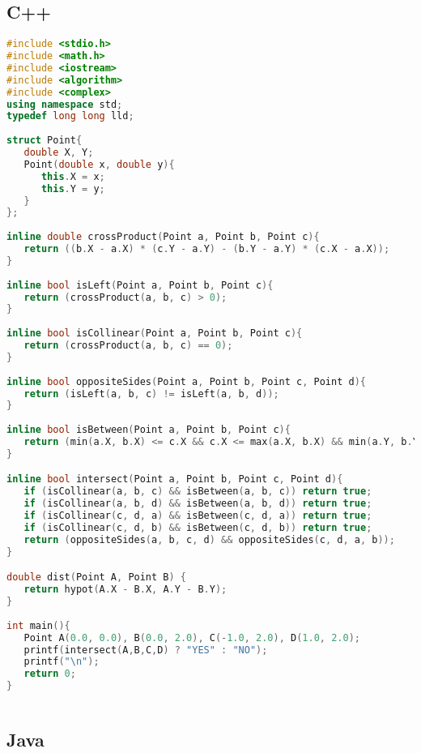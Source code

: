 \subsection{C++}

\begin{lstlisting}[language=C++]
#include <stdio.h>
#include <math.h>
#include <iostream>
#include <algorithm>
#include <complex>
using namespace std;
typedef long long lld;
	
struct Point{
   double X, Y;
   Point(double x, double y){
      this.X = x;
      this.Y = y;
   }
};
	
inline double crossProduct(Point a, Point b, Point c){
   return ((b.X - a.X) * (c.Y - a.Y) - (b.Y - a.Y) * (c.X - a.X));
}
	
inline bool isLeft(Point a, Point b, Point c){
   return (crossProduct(a, b, c) > 0);
}
	
inline bool isCollinear(Point a, Point b, Point c){
   return (crossProduct(a, b, c) == 0);
}
	
inline bool oppositeSides(Point a, Point b, Point c, Point d){
   return (isLeft(a, b, c) != isLeft(a, b, d));
}
	
inline bool isBetween(Point a, Point b, Point c){
   return (min(a.X, b.X) <= c.X && c.X <= max(a.X, b.X) && min(a.Y, b.Y) <= c.Y && c.Y <= max(a.Y,b.Y));
}

inline bool intersect(Point a, Point b, Point c, Point d){
   if (isCollinear(a, b, c) && isBetween(a, b, c)) return true;
   if (isCollinear(a, b, d) && isBetween(a, b, d)) return true;
   if (isCollinear(c, d, a) && isBetween(c, d, a)) return true;
   if (isCollinear(c, d, b) && isBetween(c, d, b)) return true;
   return (oppositeSides(a, b, c, d) && oppositeSides(c, d, a, b));
}

double dist(Point A, Point B) {
   return hypot(A.X - B.X, A.Y - B.Y);
}
	
int main(){
   Point A(0.0, 0.0), B(0.0, 2.0), C(-1.0, 2.0), D(1.0, 2.0);
   printf(intersect(A,B,C,D) ? "YES" : "NO");
   printf("\n");
   return 0;
}
	
\end{lstlisting} 

\subsection{Java}

